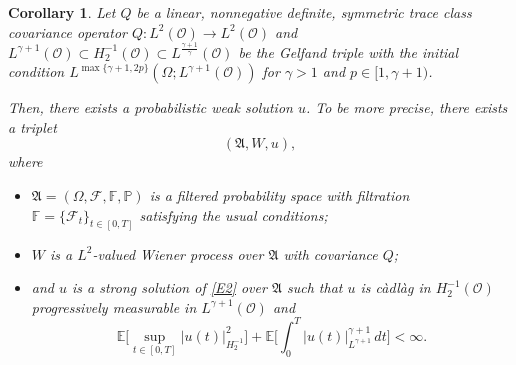 \documentclass[english,a4paper,11pt]{amsart}
\theoremstyle{plain}
\newtheorem{corollary}[theorem]{Corollary}
\theoremstyle{definition}
\theoremstyle{remark}
\numberwithin{equation}{section}
\newcommand{\CO}{{{ \mathcal O }}}
\newcommand{\EE}{ \mathbb{E} }
\newcommand{\Fcal} {{\mathcal F}}
\newcommand{\Afrak} {{\mathfrak A}}
\renewcommand{\P}{\mathbb{P}}
\begin{document}
 \begin{corollary}\label{ExistencePorous}
Let $Q$ be a  linear, nonnegative definite, symmetric trace class covariance
	operator $Q:L^2(\CO)\to L^2(\CO)$ and  $L^{\gamma+1}(\CO) \subset H_2^{-1}(\CO) \subset L^\frac{\gamma+1}{\gamma}(\CO) $ be the Gelfand triple with the initial condition $L^{\max\{\gamma+1,2p\}}(\Omega;L^{\gamma+1}(\mathcal{O}))$ for $\gamma>1$ and $p\in [1,\gamma+1)$.
	
	Then, there exists a probabilistic weak solution $u$. To be more precise, there exists a triplet
	$$
	(\mathfrak{A},  W,u),
	$$
	where 
	\begin{itemize}
		\item $\Afrak=(\Omega,\Fcal,\mathbb{F},\P)$ is a filtered probability space
		with filtration $\mathbb{F}=\{\Fcal_{t}\}_{t\in [0,T]}$ satisfying the usual conditions;
		\item $W$ is a $L^2$-valued Wiener process over $\mathfrak{A}$ with covariance $Q$;
		\item and $u$ is a strong solution of \eqref{E2} over $\mathfrak{A}$ such that $u$ is c\`adl\`ag in $H_2^{-1}(\CO)$ progressively measurable in $L^{\gamma+1}(\CO)$ and
		$$
		\EE\bigg[\sup_{t\in[0,T]} | u(t) | _{H_2^{-1}}^2\bigg] +\EE\bigg[\int_0^T | u(t) | _{L^{\gamma+1}}^{\gamma+1}\,dt\bigg] <\infty.
		$$
	\end{itemize}
\end{corollary}
\end{document}
